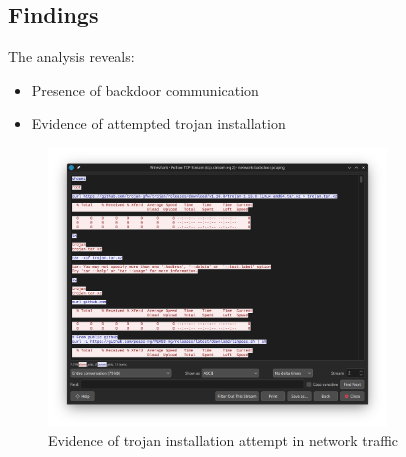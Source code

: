 \documentclass{article}
\begin{document}
\subsection{Findings}
The analysis reveals:
\begin{itemize}
    \item Presence of backdoor communication
    \item Evidence of attempted trojan installation
\end{itemize}

\begin{figure}[H]
    \centering
    \includegraphics[width=0.8\textwidth]{4}
    \caption{Evidence of trojan installation attempt in network traffic}
\end{figure}
\end{document}

